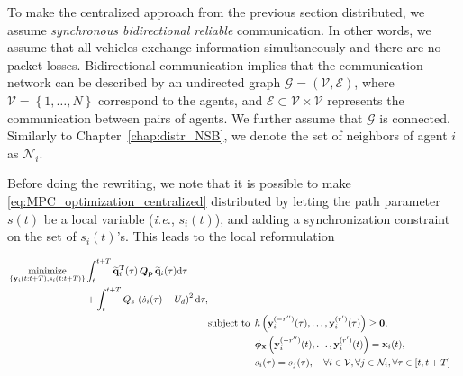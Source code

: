 To make the centralized approach from the previous section distributed, we assume \emph{synchronous bidirectional reliable} communication.
In other words, we assume that all vehicles exchange information simultaneously and there are no packet losses.
Bidirectional communication implies that the communication network can be described by an undirected graph $\mathcal{G} = \left(\mathcal{V}, \mathcal{E}\right)$, where $\mathcal{V} = \left\{1, \ldots, N\right\}$ correspond to the agents, and $\mathcal{E} \subset \mathcal{V} \times \mathcal{V}$ represents the communication between pairs of agents. We further assume that $\mathcal{G}$ is connected.
Similarly to Chapter~\ref{chap:distr_NSB}, we denote the set of neighbors of agent $i$ as $\mathcal{N}_i$.

Before doing the rewriting, we note that it is possible to make \eqref{eq:MPC_optimization_centralized} distributed by letting the path parameter $s(t)$ be a local variable (\emph{i.e.}, $s_i(t)$), and adding a synchronization constraint on the set of $s_i(t)$'s. This leads to the local reformulation

\begin{subequations}
    \begin{align}
        \begin{split}
            &\opt_{ \left\lbrace \mat{y}_i(t:t+T), s_i(t:t+T) \right\rbrace }
            \int_{t}^{t+T}
                \widetilde{\mat{q}}_i\T(\tau)
                \, \bm{Q}_{\mat{p}} \, 
                \widetilde{\mat{q}}_i(\tau)
                {\rm d}\tau \\
            & \qquad \qquad \qquad \qquad
            + \int_{t}^{t+T} Q_s \,\left(\dot{s}_i(\tau) - U_d\right)^2 {\rm d}\tau , 
        \end{split} \label{eq:MPC_criterion}\\
        & \text{subject to } \, h\left(\mat{y}_i^{(-r'')}(\tau), \ldots, \mat{y}^{(r')}_i(\tau)\right) \geq \bm{0}, \label{eq:MPC_constraint_h} \\
        & \phantom{\text{subject to } \,} \bm{\phi}_{\mat{x}} \left(\mat{y}_i^{(-r'')}(t), \ldots, \mat{y}^{(r')}_i(t)\right) = \mat{x}_{i}(t), \label{eq:MPC_constraint_x0} \\
        & \phantom{\text{subject to } \,} s_i(\tau) = s_j(\tau), \quad \forall i \in \mathcal{V}, \forall j \in \mathcal{N}_i, \forall \tau \in [t, t+T] \label{eq:MPC_constraint_gamma_s}
    \end{align}
\label{eq:MPC_optimization_distributed}

\end{subequations}

